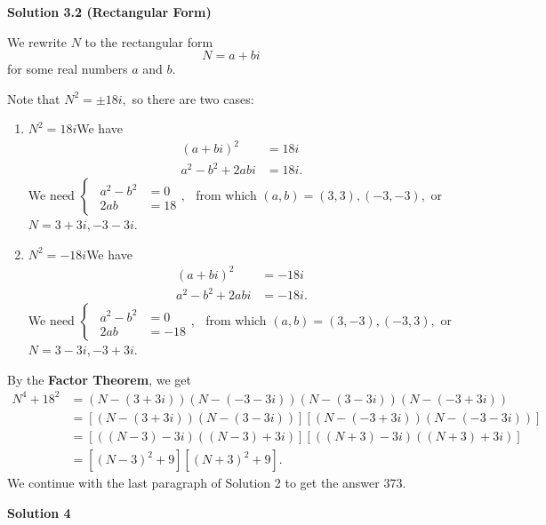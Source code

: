 \begin{enumerate}
\textbf{Solution 3.2 (Rectangular Form)}

We rewrite $N$ to the rectangular form 
 \[N=a+bi\] for some real numbers $a$ and $b.$

 Note that $N^2=\pm18i,$ so there are two cases:

 
            \begin{enumerate} 
        \item $N^2=18i$We have
 \begin{align*} (a+bi)^2&=18i \\ a^2-b^2+2abi&=18i. \end{align*}
We need $\begin{cases} \begin{aligned} a^2-b^2 &= 0 \\ 2ab &= 18 \end{aligned}, \end{cases}$ from which $(a,b)=(3,3),(-3,-3),$ or $N=3+3i,-3-3i.$


        \item $N^2=-18i$We have
 \begin{align*} (a+bi)^2&=-18i \\ a^2-b^2+2abi&=-18i. \end{align*}
We need $\begin{cases} \begin{aligned} a^2-b^2 &= 0 \\ 2ab &= -18 \end{aligned}, \end{cases}$ from which $(a,b)=(3,-3),(-3,3),$ or $N=3-3i,-3+3i.$


            \end{enumerate}
            By the \textbf{Factor Theorem}, we get
 \begin{align*} N^4+18^2&=(N-(3+3i))(N-(-3-3i))(N-(3-3i))(N-(-3+3i)) \\ &=\left[(N-(3+3i))(N-(3-3i))\right]\left[(N-(-3+3i))(N-(-3-3i))\right] \\ &=\left[((N-3)-3i)((N-3)+3i)\right]\left[((N+3)-3i)((N+3)+3i)\right] \\ &=\left[(N-3)^2+9\right]\left[(N+3)^2+9\right]. \end{align*}
We continue with the last paragraph of Solution 2 to get the answer $\boxed{373}.$




\textbf{Solution 4}


\end{enumerate}

